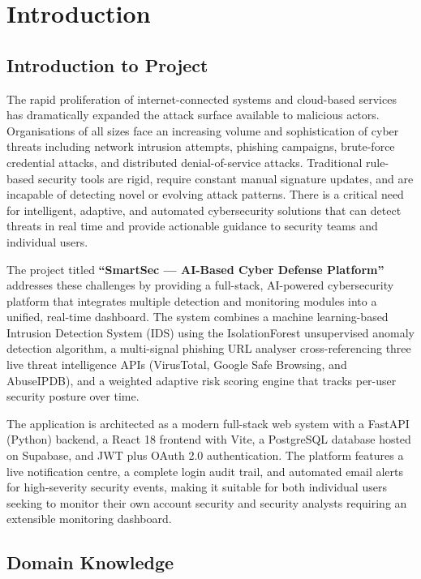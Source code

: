\thispagestyle{empty}
\chapter{Introduction}
\section{Introduction to Project}

The rapid proliferation of internet-connected systems and cloud-based services has dramatically expanded the attack surface available to malicious actors. Organisations of all sizes face an increasing volume and sophistication of cyber threats including network intrusion attempts, phishing campaigns, brute-force credential attacks, and distributed denial-of-service attacks. Traditional rule-based security tools are rigid, require constant manual signature updates, and are incapable of detecting novel or evolving attack patterns. There is a critical need for intelligent, adaptive, and automated cybersecurity solutions that can detect threats in real time and provide actionable guidance to security teams and individual users.

The project titled \textbf{``SmartSec --- AI-Based Cyber Defense Platform''} addresses these challenges by providing a full-stack, AI-powered cybersecurity platform that integrates multiple detection and monitoring modules into a unified, real-time dashboard. The system combines a machine learning-based Intrusion Detection System (IDS) using the IsolationForest unsupervised anomaly detection algorithm, a multi-signal phishing URL analyser cross-referencing three live threat intelligence APIs (VirusTotal, Google Safe Browsing, and AbuseIPDB), and a weighted adaptive risk scoring engine that tracks per-user security posture over time.

The application is architected as a modern full-stack web system with a FastAPI (Python) backend, a React 18 frontend with Vite, a PostgreSQL database hosted on Supabase, and JWT plus OAuth 2.0 authentication. The platform features a live notification centre, a complete login audit trail, and automated email alerts for high-severity security events, making it suitable for both individual users seeking to monitor their own account security and security analysts requiring an extensible monitoring dashboard.

\section{Domain Knowledge}

